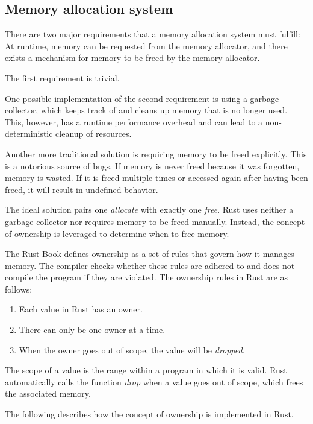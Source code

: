 \documentclass[sigplan,11pt,nonacm]{acmart}
\begin{document}
\subsection{Memory allocation system}
\label{sec:memory-allocation}

There are two major requirements that a memory allocation system must fulfill:
At runtime, memory can be requested from the memory allocator, and there exists a mechanism for memory to be freed by the memory allocator.

The first requirement is trivial.

One possible implementation of the second requirement is using a garbage collector, which keeps track of and cleans up memory that is no longer used.
This, however, has a runtime performance overhead and can lead to a non-deterministic cleanup of resources.

Another more traditional solution is requiring memory to be freed explicitly.
This is a notorious source of bugs.
If memory is never freed because it was forgotten, memory is wasted.
If it is freed multiple times or accessed again after having been freed, it will result in undefined behavior.

The ideal solution pairs one \emph{allocate} with exactly one \emph{free}.
Rust uses neither a garbage collector nor requires memory to be freed manually.
Instead, the concept of ownership is leveraged to determine when to free memory.

The Rust Book \cite{rust-book} defines ownership as a set of rules that govern how it manages memory.
The compiler checks whether these rules are adhered to and does not compile the program if they are violated.
The ownership rules in Rust are as follows:
\begin{enumerate}
  \item Each value in Rust has an owner.
  \item There can only be one owner at a time.
  \item When the owner goes out of scope, the value will be \emph{dropped}.
\end{enumerate}
The scope of a value is the range within a program in which it is valid.
Rust automatically calls the function \emph{drop} when a value goes out of scope, which frees the associated memory.

The following describes how the concept of ownership is implemented in Rust.
\end{document}
